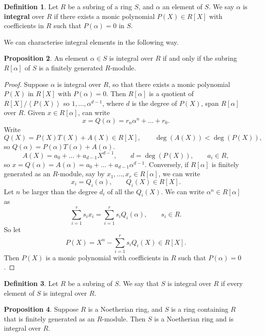 \documentclass{article}
\newcommand{\rb}[1]{\left( #1 \right)}
\renewcommand{\sb}[1]{\left[ #1 \right]}
\newcommand{\ab}[1]{\left\langle #1 \right\rangle}
\theoremstyle{definition}\newtheorem{definition}{Definition}[subsection]
\theoremstyle{definition}\newtheorem{remark}[definition]{Remark}
\theoremstyle{definition}\newtheorem*{example}{Example}
\theoremstyle{definition}\newtheorem*{note}{Note}
\newtheorem{proposition}[definition]{Proposition}
\begin{document}
\begin{definition}
Let $ R $ be a subring of a ring $ S $, and $ \alpha $ an element of $ S $. We say $ \alpha $ is \textbf{integral} over $ R $ if there exists a monic polynomial $ P\rb{X} \in R\sb{X} $ with coefficients in $ R $ such that $ P\rb{\alpha} = 0 $ in $ S $.
\end{definition}

We can characterise integral elements in the following way.

\begin{proposition}
An element $ \alpha \in S $ is integral over $ R $ if and only if the subring $ R\sb{\alpha} $ of $ S $ is a finitely generated $ R $-module.
\end{proposition}

\begin{proof}
Suppose $ \alpha $ is integral over $ R $, so that there exists a monic polynomial $ P\rb{X} $ in $ R\sb{X} $ with $ P\rb{\alpha} = 0 $. Then $ R\sb{\alpha} $ is a quotient of $ R\sb{X} / \ab{P\rb{X}} $ so $ 1, \dots, \alpha^{d - 1} $, where $ d $ is the degree of $ P\rb{X} $, span $ R\sb{\alpha} $ over $ R $. Given $ x \in R\sb{\alpha} $, can write
$$ x = Q\rb{\alpha} = r_n\alpha^n + \dots + r_0. $$
Write
$$ Q\rb{X} = P\rb{X}T\rb{X} + A\rb{X} \in R\sb{X}, \qquad \deg\rb{A\rb{X}} < \deg\rb{P\rb{X}}, $$
so $ Q\rb{\alpha} = P\rb{\alpha}T\rb{\alpha} + A\rb{\alpha} $.
$$ A\rb{X} = a_0 + \dots + a_{d - 1}X^{d - 1}, \qquad d = \deg\rb{P\rb{X}}, \qquad a_i \in R, $$
so $ x = Q\rb{\alpha} = A\rb{\alpha} = a_0 + \dots + a_{d - 1}\alpha^{d - 1} $. Conversely, if $ R\sb{\alpha} $ is finitely generated as an $ R $-module, say by $ x_1, \dots, x_r \in R\sb{\alpha} $, we can write
$$ x_i = Q_i\rb{\alpha}, \qquad Q_i\rb{X} \in R\sb{X}. $$
Let $ n $ be larger than the degree $ d_i $ of all the $ Q_i\rb{X} $. We can write $ \alpha^n \in R\sb{\alpha} $ as
$$ \sum_{i = 1}^r s_ix_i = \sum_{i = 1}^r s_iQ_i\rb{\alpha}, \qquad s_i \in R. $$
So let
$$ P\rb{X} = X^n - \sum_{i = 1}^r s_iQ_i\rb{X} \in R\sb{X}. $$
Then $ P\rb{X} $ is a monic polynomial with coefficients in $ R $ such that $ P\rb{\alpha} = 0 $.
\end{proof}

\begin{definition}
Let $ R $ be a subring of $ S $. We say that $ S $ is integral over $ R $ if every element of $ S $ is integral over $ R $.
\end{definition}

\begin{proposition}
Suppose $ R $ is a Noetherian ring, and $ S $ is a ring containing $ R $ that is finitely generated as an $ R $-module. Then $ S $ is a Noetherian ring and is integral over $ R $.
\end{proposition}
\end{document}
